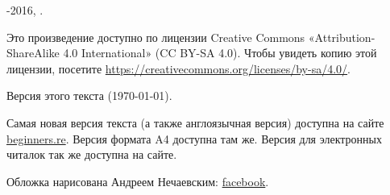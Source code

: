 ﻿\begin{titlepage}


\end{titlepage}

\newpage

\begin{center}
\vspace*{\fill}
{\LARGE \TITLE}

\vspace*{\fill}

{\large \AUTHOR}

{\large \TT{<\EMAIL>}}
\vspace*{\fill}
\vfill

\ccbysa

-2016, \AUTHOR. 

Это произведение доступно по лицензии Creative Commons «Attribution-ShareAlike 4.0 International» (CC BY-SA 4.0).
Чтобы увидеть копию этой лицензии, посетите \url{https://creativecommons.org/licenses/by-sa/4.0/}.

Версия этого текста ({\large \today}).

Самая новая версия текста (а также англоязычная версия) доступна на сайте \href{http://go.yurichev.com/17009}{beginners.re}.
\ifdefined\ebook
Версия формата A4 доступна там же.
\else
Версия для электронных читалок так же доступна на сайте.
\fi

Обложка нарисована Андреем Нечаевским: \href{http://go.yurichev.com/17023}{facebook}.

\end{center}

